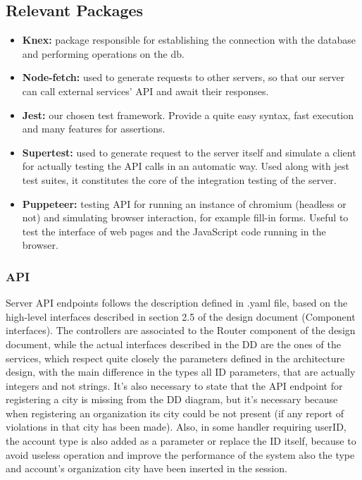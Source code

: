 \subsection{Relevant Packages}
\begin{itemize}
	\item \textbf{Knex:} package responsible for establishing the connection with the database and performing operations on the db. 
	\item \textbf{Node-fetch:} used to generate requests to other servers, so that our server can call external services' API and await their responses.
	\item \textbf{Jest:} our chosen test framework. Provide a quite easy syntax, fast execution and many features for assertions.
	\item \textbf{Supertest:} used to generate request to the server itself and simulate a client for actually testing the API calls in an automatic way. Used along with jest test suites, it constitutes the core of the integration testing of the server.
	\item \textbf{Puppeteer:} testing API for running an instance of chromium (headless or not) and simulating browser interaction, for example fill-in forms. Useful to test the interface of web pages and the JavaScript code running in the browser.
\end{itemize}

\subsubsection{API}
Server API endpoints follows the description defined in .yaml file, based on the high-level interfaces described in section 2.5 of the design document (Component interfaces). The controllers are associated to the Router component of the design document, while the actual interfaces described in the DD are the ones of the services, which respect quite closely the parameters defined in the architecture design, with the main difference in the types all ID parameters, that are actually integers and not strings. It's also necessary to state that the API endpoint for registering a city is missing from the DD diagram, but it's necessary because when registering an organization its city could be not present (if any report of violations in that city has been made). Also, in some handler requiring userID, the account type is also added as a parameter or replace the ID itself, because to avoid useless operation and improve the performance of the system also the type and account's organization city have been inserted in the session. 